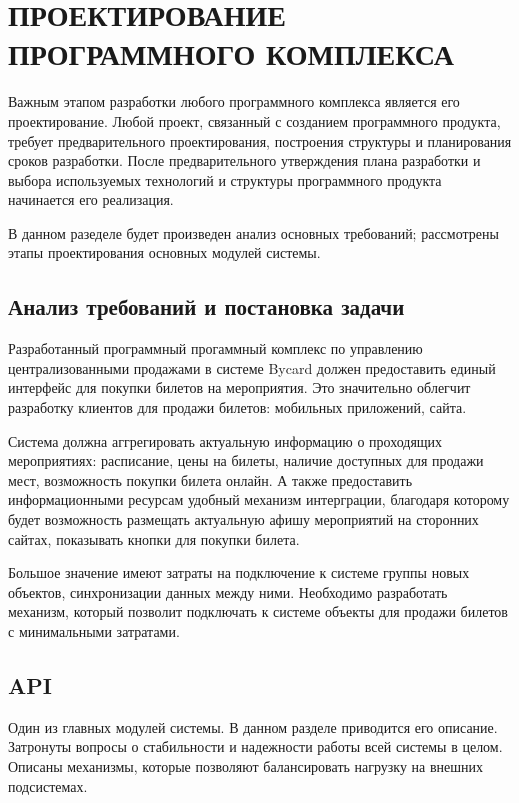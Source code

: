 \section{ПРОЕКТИРОВАНИЕ ПРОГРАММНОГО КОМПЛЕКСА}

Важным этапом разработки любого программного комплекса является его проектирование. Любой проект, связанный с созданием программного продукта, требует предварительного проектирования, построения структуры и планирования сроков разработки. После предварительного утверждения плана разработки и выбора используемых технологий и структуры программного продукта начинается его реализация.

В данном разеделе будет произведен анализ основных требований; рассмотрены этапы проектирования основных модулей системы.

\subsection{Анализ требований и постановка задачи}

Разработанный программный прогаммный комплекс по управлению централизованными продажами в системе Bycard должен предоставить единый интерфейс для покупки билетов на мероприятия. Это значительно облегчит разработку клиентов для продажи билетов: мобильных приложений, сайта.

Система должна аггрегировать актуальную информацию о проходящих мероприятиях: расписание, цены на билеты, наличие доступных для продажи мест, возможность покупки билета онлайн. А также предоставить информационными ресурсам удобный механизм интерграции, благодаря которому будет возможность размещать актуальную афишу мероприятий на сторонних сайтах, показывать кнопки для покупки билета.

Большое значение имеют затраты на подключение к системе группы новых объектов, синхронизации данных между ними. Необходимо разработать механизм, который позволит подключать к системе объекты для продажи билетов с минимальными затратами.

\subsection{API}

Один из главных модулей системы. В данном разделе приводится его описание. Затронуты вопросы о стабильности и надежности работы всей системы в целом. Описаны механизмы, которые позволяют балансировать нагрузку на внешних подсистемах.

